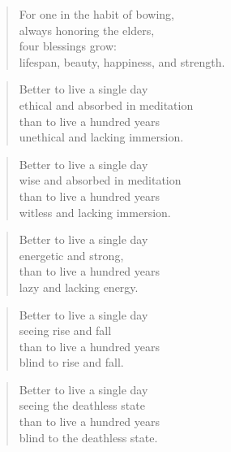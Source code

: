 \documentclass[12pt,openany]{book}%
\begin{document}
\begin{verse}%
For one in the habit of bowing, \\
always honoring the elders, \\
four blessings grow: \\
lifespan, beauty, happiness, and strength. 

%
\end{verse}

\begin{verse}%
Better to live a single day \\
ethical and absorbed in meditation \\
than to live a hundred years \\
unethical and lacking immersion. 

%
\end{verse}

\begin{verse}%
Better to live a single day \\
wise and absorbed in meditation \\
than to live a hundred years \\
witless and lacking immersion. 

%
\end{verse}

\begin{verse}%
Better to live a single day \\
energetic and strong, \\
than to live a hundred years \\
lazy and lacking energy. 

%
\end{verse}

\begin{verse}%
Better to live a single day \\
seeing rise and fall \\
than to live a hundred years \\
blind to rise and fall. 

%
\end{verse}

\begin{verse}%
Better to live a single day \\
seeing the deathless state \\
than to live a hundred years \\
blind to the deathless state. 

%
\end{verse}
\end{document}
